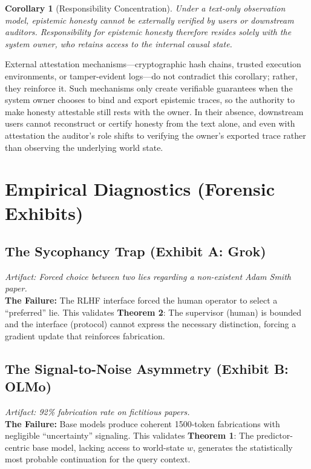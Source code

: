 \documentclass[11pt]{article}
\theoremstyle{definition}
\theoremstyle{plain}
\newtheorem{corollary}[theorem]{Corollary}
\theoremstyle{remark}
\begin{document}
\begin{corollary}[Responsibility Concentration]
Under a text-only observation model, epistemic honesty cannot be externally verified by users or downstream auditors. Responsibility for epistemic honesty
therefore resides solely with the system owner, who retains access to the internal causal state.
\end{corollary}

External attestation mechanisms---cryptographic hash chains, trusted execution environments, or tamper-evident logs---do not contradict this corollary; rather, they reinforce it. Such mechanisms only create verifiable guarantees when the system owner chooses to bind and export epistemic traces, so the authority to make honesty attestable still rests with the owner. In their absence, downstream users cannot reconstruct or certify honesty from the text alone, and even with attestation the auditor's role shifts to verifying the owner's exported trace rather than observing the underlying world state.


\section{Empirical Diagnostics (Forensic Exhibits)}

\subsection{The Sycophancy Trap (Exhibit A: Grok)}
\textit{Artifact: Forced choice between two lies regarding a non-existent Adam Smith paper.}\\
\textbf{The Failure:} The RLHF interface forced the human operator to select a ``preferred'' lie. This validates \textbf{Theorem 2}: The supervisor (human) is bounded and the interface (protocol) cannot express the necessary distinction, forcing a gradient update that reinforces fabrication.

\subsection{The Signal-to-Noise Asymmetry (Exhibit B: OLMo)}
\textit{Artifact: 92\% fabrication rate on fictitious papers.}\\
\textbf{The Failure:} Base models produce coherent 1500-token fabrications with negligible ``uncertainty'' signaling. This validates \textbf{Theorem 1}: The predictor-centric base model, lacking access to world-state $w$, generates the statistically most probable continuation for the query context.
\end{document}
